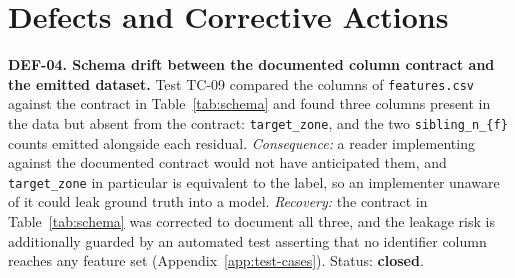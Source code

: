 \section{Defects and Corrective Actions}
\label{sec:defects}

\textbf{DEF-04. Schema drift between the documented column contract and the emitted
dataset.} Test TC-09 compared the columns of \texttt{features.csv} against the
contract in Table~\ref{tab:schema} and found three columns present in the data but
absent from the contract: \texttt{target\_zone}, and the two
\texttt{sibling\_n\_\{f\}} counts emitted alongside each residual.
\emph{Consequence:} a reader implementing against the documented contract would not
have anticipated them, and \texttt{target\_zone} in particular is equivalent to the
label, so an implementer unaware of it could leak ground truth into a model.
\emph{Recovery:} the contract in Table~\ref{tab:schema} was corrected to document all
three, and the leakage risk is additionally guarded by an automated test asserting
that no identifier column reaches any feature set (Appendix~\ref{app:test-cases}). Status:
\textbf{closed}.

